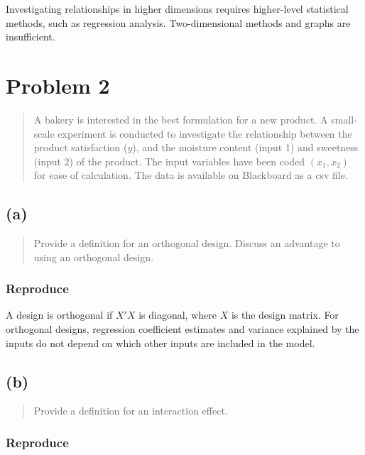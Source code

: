 \documentclass[
]{article}
\begin{document}
Investigating relationships in higher dimensions requires higher-level
statistical methods, such as regression analysis. Two-dimensional
methods and graphs are insufficient.

\hypertarget{problem-2}{%
\section{Problem 2}\label{problem-2}}

\begin{quote}
A bakery is interested in the best formulation for a new product. A
small-scale experiment is conducted to investigate the relationship
between the product satisfaction (\(y\)), and the moisture content
(input 1) and sweetness (input 2) of the product. The input variables
have been coded \((x_1,x_2)\) for ease of calculation. The data is
available on Blackboard as a csv file.
\end{quote}

\hypertarget{a-1}{%
\subsection{(a)}\label{a-1}}

\begin{quote}
Provide a definition for an orthogonal design. Discuss an advantage to
using an orthogonal design.
\end{quote}

\hypertarget{reproduce-7}{%
\subsubsection{Reproduce}\label{reproduce-7}}

A design is orthogonal if \(X'X\) is diagonal, where \(X\) is the design
matrix. For orthogonal designs, regression coefficient estimates and
variance explained by the inputs do not depend on which other inputs are
included in the model.

\hypertarget{b-1}{%
\subsection{(b)}\label{b-1}}

\begin{quote}
Provide a definition for an interaction effect.
\end{quote}

\hypertarget{reproduce-8}{%
\subsubsection{Reproduce}\label{reproduce-8}}
\end{document}
